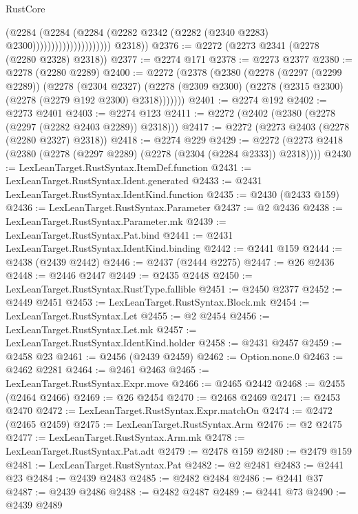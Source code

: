 \begin{lexlean}{RustCore}
\begin{coremodule}
                                        (@2284
                                          (@2284
                                            (@2284
                                              (@2282
                                                @2342
                                                (@2282 (@2340 @2283) @2300)))))))))))))))))))))
        @2318))
@2376 := @2272 (@2273 @2341 (@2278 (@2280 @2328) @2318))
@2377 := @2274 @171
@2378 := @2273 @2377
@2380 := @2278 (@2280 @2289)
@2400 := @2272
    (@2378
      (@2380
        (@2278
          (@2297 (@2299 @2289))
          (@2278
            (@2304 @2327)
            (@2278 (@2309 @2300) (@2278 (@2315 @2300) (@2278 (@2279 @192 @2300) @2318)))))))
@2401 := @2274 @192
@2402 := @2273 @2401
@2403 := @2274 @123
@2411 := @2272 (@2402 (@2380 (@2278 (@2297 (@2282 @2403 @2289)) @2318)))
@2417 := @2272 (@2273 @2403 (@2278 (@2280 @2327) @2318))
@2418 := @2274 @229
@2429 := @2272 (@2273 @2418 (@2380 (@2278 (@2297 @2289) (@2278 (@2304 (@2284 @2333)) @2318))))
@2430 := LexLeanTarget.RustSyntax.ItemDef.function
@2431 := LexLeanTarget.RustSyntax.Ident.generated
@2433 := @2431 LexLeanTarget.RustSyntax.IdentKind.function
@2435 := @2430 (@2433 @159)
@2436 := LexLeanTarget.RustSyntax.Parameter
@2437 := @2 @2436
@2438 := LexLeanTarget.RustSyntax.Parameter.mk
@2439 := LexLeanTarget.RustSyntax.Pat.bind
@2441 := @2431 LexLeanTarget.RustSyntax.IdentKind.binding
@2442 := @2441 @159
@2444 := @2438 (@2439 @2442)
@2446 := @2437 (@2444 @2275)
@2447 := @26 @2436
@2448 := @2446 @2447
@2449 := @2435 @2448
@2450 := LexLeanTarget.RustSyntax.RustType.fallible
@2451 := @2450 @2377
@2452 := @2449 @2451
@2453 := LexLeanTarget.RustSyntax.Block.mk
@2454 := LexLeanTarget.RustSyntax.Let
@2455 := @2 @2454
@2456 := LexLeanTarget.RustSyntax.Let.mk
@2457 := LexLeanTarget.RustSyntax.IdentKind.holder
@2458 := @2431 @2457
@2459 := @2458 @23
@2461 := @2456 (@2439 @2459)
@2462 := Option.none.{0}
@2463 := @2462 @2281
@2464 := @2461 @2463
@2465 := LexLeanTarget.RustSyntax.Expr.move
@2466 := @2465 @2442
@2468 := @2455 (@2464 @2466)
@2469 := @26 @2454
@2470 := @2468 @2469
@2471 := @2453 @2470
@2472 := LexLeanTarget.RustSyntax.Expr.matchOn
@2474 := @2472 (@2465 @2459)
@2475 := LexLeanTarget.RustSyntax.Arm
@2476 := @2 @2475
@2477 := LexLeanTarget.RustSyntax.Arm.mk
@2478 := LexLeanTarget.RustSyntax.Pat.adt
@2479 := @2478 @159
@2480 := @2479 @159
@2481 := LexLeanTarget.RustSyntax.Pat
@2482 := @2 @2481
@2483 := @2441 @23
@2484 := @2439 @2483
@2485 := @2482 @2484
@2486 := @2441 @37
@2487 := @2439 @2486
@2488 := @2482 @2487
@2489 := @2441 @73
@2490 := @2439 @2489

\end{coremodule}
\end{lexlean}
